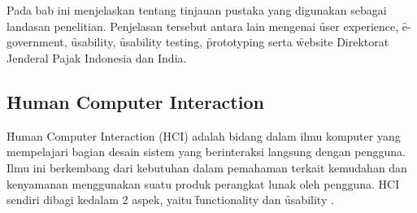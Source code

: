 \chapter{\babDua}
Pada bab ini menjelaskan tentang tinjauan pustaka yang digunakan sebagai landasan penelitian.
Penjelasan tersebut antara lain mengenai \f{user experience}, \f{e-government},
\f{usability}, \f{usability testing}, \f{prototyping} serta \f{website} Direktorat Jenderal Pajak Indonesia dan India.

\section{\f{Human Computer Interaction}}
\f{Human Computer Interaction} (HCI) adalah bidang dalam ilmu komputer yang mempelajari bagian desain sistem yang berinteraksi langsung dengan pengguna. Ilmu ini berkembang dari kebutuhan dalam pemahaman terkait kemudahan dan kenyamanan menggunakan suatu produk perangkat lunak oleh pengguna. HCI sendiri dibagi kedalam 2 aspek, yaitu \f{functionality} dan \f{usability} \citep{}. 
